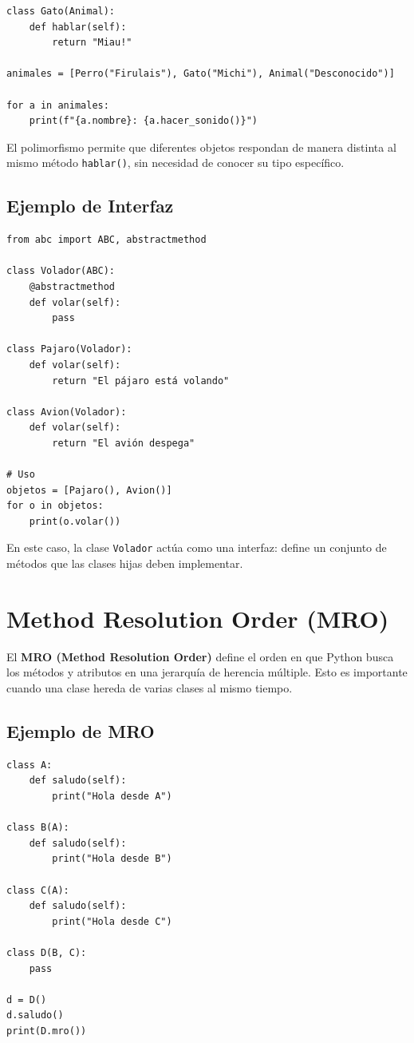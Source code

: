\documentclass{article}
\begin{document}
\begin{verbatim}
class Gato(Animal):
    def hablar(self):
        return "Miau!"

animales = [Perro("Firulais"), Gato("Michi"), Animal("Desconocido")]

for a in animales:
    print(f"{a.nombre}: {a.hacer_sonido()}")
\end{verbatim}

El polimorfismo permite que diferentes objetos respondan de manera distinta al mismo método \texttt{hablar()}, sin necesidad de conocer su tipo específico.
\newpage
\subsection{Ejemplo de Interfaz}

\begin{verbatim}
from abc import ABC, abstractmethod

class Volador(ABC):
    @abstractmethod
    def volar(self):
        pass

class Pajaro(Volador):
    def volar(self):
        return "El pájaro está volando"

class Avion(Volador):
    def volar(self):
        return "El avión despega"

# Uso
objetos = [Pajaro(), Avion()]
for o in objetos:
    print(o.volar())
\end{verbatim}

En este caso, la clase \texttt{Volador} actúa como una interfaz: define un conjunto de métodos que las clases hijas deben implementar.


\section{Method Resolution Order (MRO)}

El \textbf{MRO (Method Resolution Order)} define el orden en que Python busca los métodos y atributos en una jerarquía de herencia múltiple.  
Esto es importante cuando una clase hereda de varias clases al mismo tiempo.

\subsection{Ejemplo de MRO}

\begin{verbatim}
class A:
    def saludo(self):
        print("Hola desde A")

class B(A):
    def saludo(self):
        print("Hola desde B")

class C(A):
    def saludo(self):
        print("Hola desde C")

class D(B, C):
    pass

d = D()
d.saludo()
print(D.mro())
\end{verbatim}
\end{document}
